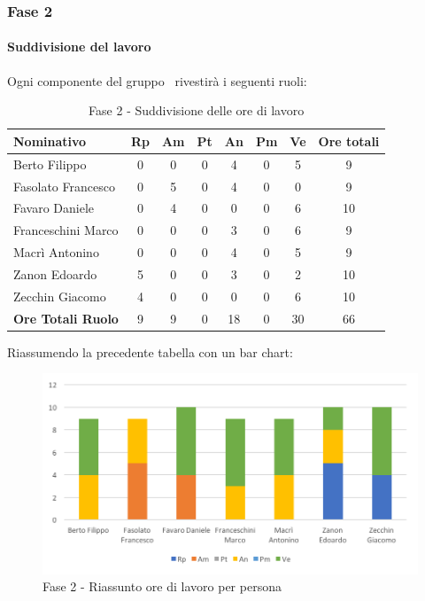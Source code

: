 \documentclass[../PianoDiProgetto.tex]{subfiles}
\begin{document}
		\newpage			
		\subsubsection{Fase 2}
			\paragraph{Suddivisione del lavoro}
			Ogni componente del gruppo \kpanic\ rivestirà i seguenti ruoli:
			\begin{table}[h]
				\begin{tabularx}{\textwidth}{l * {6}{C} c}
				\toprule
				\textbf{Nominativo} & \textbf{Rp} & \textbf{Am} & \textbf{Pt} & \textbf{An} & \textbf{Pm} & \textbf{Ve} & \textbf{Ore totali} \\
				\midrule
				Berto Filippo &	0 & 0 & 0 & 4 & 0 & 5 & 9 \\
				Fasolato Francesco & 0 & 5 & 0 & 4 & 0 & 0 & 9 \\
				Favaro Daniele & 0 & 4 & 0 & 0 & 0 & 6 & 10 \\
				Franceschini Marco & 0 & 0 & 0 & 3 & 0 & 6 & 9 \\
				Macrì Antonino & 0 & 0 & 0 & 4 & 0 & 5 & 9 \\
				Zanon Edoardo &	5 & 0 & 0 & 3 & 0 & 2 & 10 \\
				Zecchin Giacomo & 4 & 0 & 0 & 0 & 0 & 6 & 10 \\
				\midrule			
				\textbf{Ore Totali Ruolo} & 9 & 9 & 0 & 18 & 0 & 30 & 66 \\
				\bottomrule
				\end{tabularx}
				\caption{Fase 2 - Suddivisione delle ore di lavoro}		
			\end{table}
			
			Riassumendo la precedente tabella con un bar chart:	
			\begin{figure}[!h]
				\centering
				\includegraphics[width=\textwidth]{Preventivo/Immagini/fase2_oreRuoloPersona.png}
				\caption{Fase 2 - Riassunto ore di lavoro per persona}
			\end{figure}	
			
\end{document}
